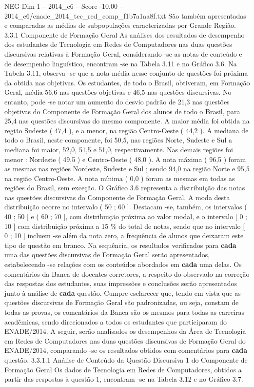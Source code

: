 \begin{textsample}{NEG Dim 1 – 2014\_c6 – Score -10.00 – 2014\_c6/enade\_2014\_tec\_red\_comp\_f1b7a1aa8f.txt}
São também apresentadas e comparadas as médias de subpopulações caracterizadas por Grande Região. 3.3.1 Componente de Formação Geral As análises dos resultados de desempenho dos estudantes de Tecnologia em Redes de Computadores nas duas questões discursivas relativas à Formação Geral, considerando -se as notas de conteúdo e de desempenho linguístico, encontram -se na Tabela 3.11 e no Gráfico 3.6.
Na Tabela 3.11, observa -se que a nota média nesse conjunto de questões foi próxima da obtida nas objetivas.
Os estudantes, de todo o Brasil, obtiveram, em Formação Geral, média 56,6 nas questões objetivas e 46,5 nas questões discursivas.
No entanto, pode -se notar um aumento do desvio padrão de 21,3 nas questões objetivas do Componente de Formação Geral dos alunos de todo o Brasil, para 25,4 nas questões discursivas do mesmo componente.
A maior média foi obtida na região Sudeste ( 47,4 ), e a menor, na região Centro-Oeste ( 44,2 ).
A mediana de todo o Brasil, neste componente, foi 50,5, nas regiões Norte, Sudeste e Sul a mediana foi maior, 52,0, 51,5 e 51,0, respectivamente.
Nas demais regiões foi menor : Nordeste ( 49,5 ) e Centro-Oeste ( 48,0 ).
A nota máxima ( 96,5 ) foram as mesmas nas regiões Nordeste, Sudeste e Sul ; sendo 94,0 na região Norte e 95,5 na região Centro-Oeste.
A nota mínima ( 0,0 ) foram as mesmas em todas as regiões do Brasil, sem exceção.
O Gráfico 3.6 representa a distribuição das notas nas questões discursivas do Componente de Formação Geral.
A moda desta distribuição ocorre no intervalo ( 50 ; 60 ].
Destacam -se, também, os intervalos ( 40 ; 50 ] e ( 60 ; 70 ], com distribuição próxima ao valor modal, e o intervalo [ 0 ; 10 ] com distribuição próxima a 15 \% do total de notas, sendo que no intervalo [ 0 ; 10 ] incluem -se além da nota zero, a frequência de alunos que deixaram este tipo de questão em branco.
Na sequência, os resultados verificados para \textbf{cada} uma das questões discursivas de Formação Geral serão apresentados, estabelecendo -se relações com os conteúdos abordados em \textbf{cada} uma delas.
Os comentários da Banca de docentes corretores, a respeito do observado na correção das respostas dos estudantes, suas impressões e conclusões serão apresentados junto à análise de \textbf{cada} questão.
Cumpre esclarecer que, tendo em vista que as questões discursivas de Formação Geral são padronizadas, ou seja, constam de todas as provas, os comentários da Banca são os mesmos para todas as carreiras acadêmicas, sendo direcionados a todos os estudantes que participaram do ENADE/2014.
A seguir, serão analisados os desempenhos da Área de Tecnologia em Redes de Computadores nas duas questões discursivas de Formação Geral do ENADE/2014, comparando -se os resultados obtidos com comentários para \textbf{cada} questão. 3.3.1.1 Análise de Conteúdo da Questão Discursiva 1 do Componente de Formação Geral Os dados de Tecnologia em Redes de Computadores, obtidos a partir das respostas à questão 1, encontram -se na Tabela 3.12 e no Gráfico 3.7.

\end{textsample}
